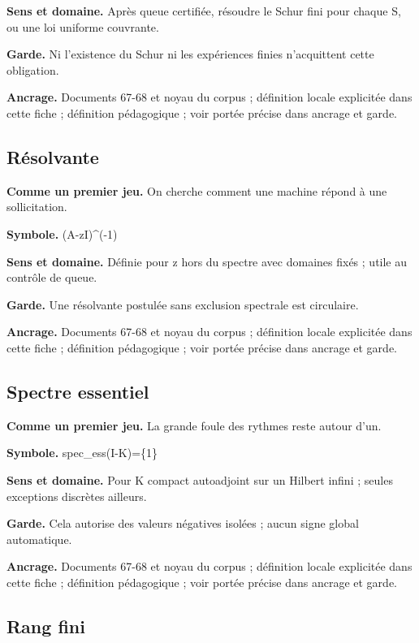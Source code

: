 \documentclass[
  9pt,
  a4paper,
]{article}
\begin{document}
\textbf{Sens et domaine.} Après queue certifiée, résoudre le Schur fini
pour chaque S, ou une loi uniforme couvrante.

\textbf{Garde.} Ni l'existence du Schur ni les expériences finies
n'acquittent cette obligation.

\textbf{Ancrage.} Documents 67-68 et noyau du corpus ; définition locale
explicitée dans cette fiche ; définition pédagogique ; voir portée
précise dans ancrage et garde.

\hypertarget{ruxe9solvante}{%
\subsection{Résolvante}\label{ruxe9solvante}}

\textbf{Comme un premier jeu.} On cherche comment une machine répond à
une sollicitation.

\textbf{Symbole.} (A-zI)\^{}(-1)

\textbf{Sens et domaine.} Définie pour z hors du spectre avec domaines
fixés ; utile au contrôle de queue.

\textbf{Garde.} Une résolvante postulée sans exclusion spectrale est
circulaire.

\textbf{Ancrage.} Documents 67-68 et noyau du corpus ; définition locale
explicitée dans cette fiche ; définition pédagogique ; voir portée
précise dans ancrage et garde.

\hypertarget{spectre-essentiel}{%
\subsection{Spectre essentiel}\label{spectre-essentiel}}

\textbf{Comme un premier jeu.} La grande foule des rythmes reste autour
d'un.

\textbf{Symbole.} spec\_ess(I-K)=\{1\}

\textbf{Sens et domaine.} Pour K compact autoadjoint sur un Hilbert
infini ; seules exceptions discrètes ailleurs.

\textbf{Garde.} Cela autorise des valeurs négatives isolées ; aucun
signe global automatique.

\textbf{Ancrage.} Documents 67-68 et noyau du corpus ; définition locale
explicitée dans cette fiche ; définition pédagogique ; voir portée
précise dans ancrage et garde.

\hypertarget{rang-fini}{%
\subsection{Rang fini}\label{rang-fini}}
\end{document}
